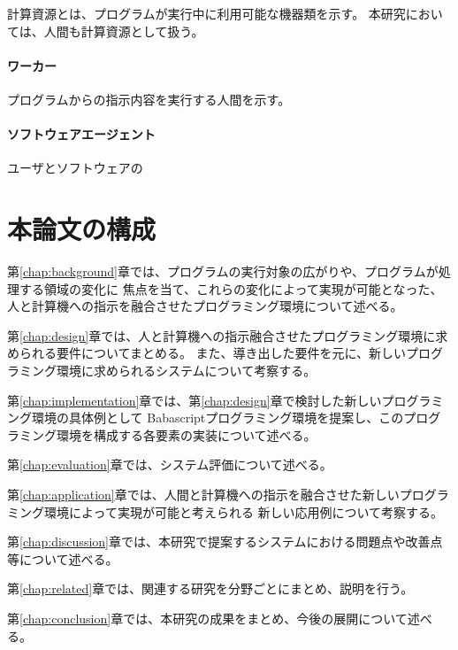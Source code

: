 計算資源とは、プログラムが実行中に利用可能な機器類を示す。
本研究においては、人間も計算資源として扱う。

\paragraph{ワーカー}\label{ux30efux30fcux30abux30fc}

プログラムからの指示内容を実行する人間を示す。

\paragraph{ソフトウェアエージェント}\label{ux30bdux30d5ux30c8ux30a6ux30a7ux30a2ux30a8ux30fcux30b8ux30a7ux30f3ux30c8}

ユーザとソフトウェアの

\section{本論文の構成}\label{ux672cux8ad6ux6587ux306eux69cbux6210}

第\ref{chap:background}章では、プログラムの実行対象の広がりや、プログラムが処理する領域の変化に
焦点を当て、これらの変化によって実現が可能となった、人と計算機への指示を融合させたプログラミング環境について述べる。

第\ref{chap:design}章では、人と計算機への指示融合させたプログラミング環境に求められる要件についてまとめる。
また、導き出した要件を元に、新しいプログラミング環境に求められるシステムについて考察する。

第\ref{chap:implementation}章では、第\ref{chap:design}章で検討した新しいプログラミング環境の具体例として
Babascriptプログラミング環境を提案し、このプログラミング環境を構成する各要素の実装について述べる。

第\ref{chap:evaluation}章では、システム評価について述べる。

第\ref{chap:application}章では、人間と計算機への指示を融合させた新しいプログラミング環境によって実現が可能と考えられる
新しい応用例について考察する。

第\ref{chap:discussion}章では、本研究で提案するシステムにおける問題点や改善点等について述べる。

第\ref{chap:related}章では、関連する研究を分野ごとにまとめ、説明を行う。

第\ref{chap:conclusion}章では、本研究の成果をまとめ、今後の展開について述べる。
